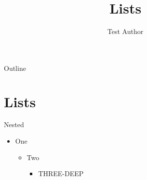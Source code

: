 \documentclass[aspectratio=169,9pt]{beamer}
\title{Lists}
\author{Test Author}
\begin{document}
\maketitle
\begin{frame}[toc]{Outline}
	\tableofcontents
\end{frame}
\section{Lists}
\begin{frame}{Nested}
	\begin{itemize}
		\item One
		\begin{itemize}
			\item Two
			\begin{itemize}\item THREE-DEEP\end{itemize}
		\end{itemize}
	\end{itemize}
\end{frame}
\end{document}
